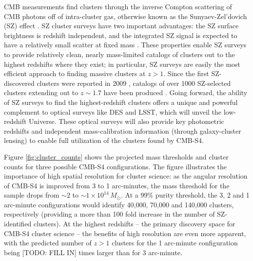 CMB measurements find clusters through the inverse Compton scattering of CMB photons off of intra-cluster gas, otherwise known as the Sunyaev-Zel'dovich (SZ) effect \cite{Sunyaev:1972eq}. SZ cluster surveys have two important advantages: the SZ surface brightness is redshift independent, and the integrated SZ signal is expected to have a relatively small scatter at fixed mass \cite{Nagai:2005wx, Nagai:2007mt, Kravtsov:2012zs}. These properties enable SZ surveys to provide relatively clean, nearly mass-limited catalogs of clusters out to the highest redshifts where they exist; in particular, SZ surveys are easily the most efficient approach to finding massive clusters at $z > 1$. Since the first SZ-discovered clusters were reported in 2009 \cite{Staniszewski:2008ma}, catalogs of over 1000 SZ-selected clusters extending out to $z \sim 1.7$ have been produced \cite{Vanderlinde:2010eb, Reichardt:2012yj, Hasselfield:2013wf, Ade:2013skr, Bleem:2014iim, Ade:2015mva}. Going forward, the ability of SZ surveys to find the highest-redshift clusters offers a unique and powerful complement to optical surveys like DES and LSST, which will unveil the low-redshift Universe. These optical surveys will also provide key photometric redshifts and independent mass-calibration information (through galaxy-cluster lensing) to enable full utilization of the clusters found by CMB-S4.

Figure \ref{fig:cluster_counts} shows the projected mass thresholds and cluster counts for three possible CMB-S4 configurations. The figure illustrates the importance of high spatial resolution for cluster science: as the angular resolution of CMB-S4 is improved from 3 to 1 arc-minutes, the mass threshold for the sample drops from $\sim2$ to $\sim1\times 10^{14}\,M_{\odot}$. At a 99\% purity threshold, the 3, 2 and 1 arc-minute configurations would identify 40,000, 70,000 and 140,000 clusters, respectively (providing a more than 100 fold increase in the number of SZ-identified clusters). At the highest redshifts -- the primary discovery space for CMB-S4 cluster science -- the benefits of high resolution are even more apparent, with the predicted number of $z>1$ clusters for the 1 arc-minute configuration being [TODO: FILL IN] times larger than for 3 arc-minute.

